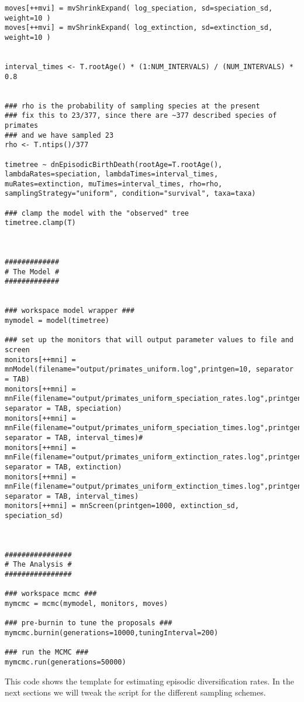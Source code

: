 {\begin{snugshade*}
\begin{lstlisting}
moves[++mvi] = mvShrinkExpand( log_speciation, sd=speciation_sd, weight=10 )
moves[++mvi] = mvShrinkExpand( log_extinction, sd=extinction_sd, weight=10 )


interval_times <- T.rootAge() * (1:NUM_INTERVALS) / (NUM_INTERVALS) * 0.8


### rho is the probability of sampling species at the present
### fix this to 23/377, since there are ~377 described species of primates
### and we have sampled 23
rho <- T.ntips()/377

timetree ~ dnEpisodicBirthDeath(rootAge=T.rootAge(), lambdaRates=speciation, lambdaTimes=interval_times, muRates=extinction, muTimes=interval_times, rho=rho, samplingStrategy="uniform", condition="survival", taxa=taxa)

### clamp the model with the "observed" tree
timetree.clamp(T)



#############
# The Model #
#############


### workspace model wrapper ###
mymodel = model(timetree)

### set up the monitors that will output parameter values to file and screen 
monitors[++mni] = mnModel(filename="output/primates_uniform.log",printgen=10, separator = TAB)
monitors[++mni] = mnFile(filename="output/primates_uniform_speciation_rates.log",printgen=10, separator = TAB, speciation)
monitors[++mni] = mnFile(filename="output/primates_uniform_speciation_times.log",printgen=10, separator = TAB, interval_times)#
monitors[++mni] = mnFile(filename="output/primates_uniform_extinction_rates.log",printgen=10, separator = TAB, extinction)
monitors[++mni] = mnFile(filename="output/primates_uniform_extinction_times.log",printgen=10, separator = TAB, interval_times)
monitors[++mni] = mnScreen(printgen=1000, extinction_sd, speciation_sd)



################
# The Analysis #
################

### workspace mcmc ###
mymcmc = mcmc(mymodel, monitors, moves)

### pre-burnin to tune the proposals ###
mymcmc.burnin(generations=10000,tuningInterval=200)

### run the MCMC ###
mymcmc.run(generations=50000)
\end{lstlisting}
\end{snugshade*}}
This \Rev code shows the template for estimating episodic diversification rates.
In the next sections we will tweak the script for the different sampling schemes.



